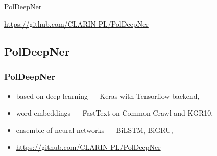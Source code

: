 \documentclass[Warsaw]{beamer}
\begin{document}
\subsection{}

\begin{frame}
    \begin{center}
        \Huge
        PolDeepNer
        
        \normalsize
        \url{https://github.com/CLARIN-PL/PolDeepNer}
    \end{center}
\end{frame}

\subsection{PolDeepNer}

\begin{frame}
    \frametitle{PolDeepNer}
    \begin{itemize}
        \item based on deep learning --- Keras with Tensorflow backend,
        \item word embeddings --- FastText on Common Crawl and KGR10,
        \item ensemble of neural networks --- BiLSTM, BiGRU,
        \item \url{https://github.com/CLARIN-PL/PolDeepNer}
    \end{itemize}
\end{frame}

\end{document}
